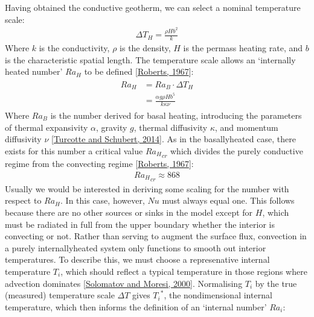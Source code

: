 \documentclass[letterpaper,10pt,english]{jupyterBook}
\begin{document}
\sphinxAtStartPar
Having obtained the conductive geotherm, we can select a nominal temperature scale:
\begin{equation*}
\begin{split}
{\Delta T}_H = \frac{\rho H b^2}{k}
\end{split}
\end{equation*}
\sphinxAtStartPar
Where \(k\) is the conductivity, \(\rho\) is the density, \(H\) is the per\sphinxhyphen{}mass heating rate, and \(b\) is the characteristic spatial length. The temperature scale allows an ‘internally heated  number’ \({Ra}_H\) to be defined {[}\hyperlink{cite.references:id675}{Roberts, 1967}{]}:
\begin{equation*}
\begin{split} \begin{align*}
{Ra}_H &= {Ra}_B \cdot {\Delta T}_H \\
&= \frac{\alpha g \rho H b^5}{k \kappa \nu}
\end{align*} \end{split}
\end{equation*}
\sphinxAtStartPar
Where \({Ra}_B\) is the  number derived for basal heating, introducing the parameters of thermal expansivity \(\alpha\), gravity \(g\), thermal diffusivity \(\kappa\), and momentum diffusivity \(\nu\) {[}\hyperlink{cite.references:id664}{Turcotte and Schubert, 2014}{]}. As in the basally\sphinxhyphen{}heated case, there exists for this number a critical value \({{Ra}_{H}}_{cr}\) which divides the purely conductive regime from the convecting regime {[}\hyperlink{cite.references:id675}{Roberts, 1967}{]}:
\begin{equation*}
\begin{split}
{{Ra}_{H}}_{cr} \approx 868
\end{split}
\end{equation*}
\sphinxAtStartPar
Usually we would be interested in deriving some scaling for the  number with respect to \({Ra}_H\). In this case, however, \(Nu\) must always equal one. This follows because there are no other sources or sinks in the model except for \(H\), which must be radiated in full from the upper boundary whether the interior is convecting or not. Rather than serving to augment the surface flux, convection in a purely internally\sphinxhyphen{}heated system only functions to smooth out interior temperatures. To describe this, we must choose a represenative internal temperature \(T_{i}\), which should reflect a typical temperature in those regions where advection dominates {[}\hyperlink{cite.references:id827}{Solomatov and Moresi, 2000}{]}. Normalising \(T_{i}\) by the true (measured) temperature scale \(\Delta T\) gives \({T_{i}}^{*}\), the non\sphinxhyphen{}dimensional internal temperature, which then informs the definition of an ‘internal  number’ \({Ra}_i\):
\end{document}
